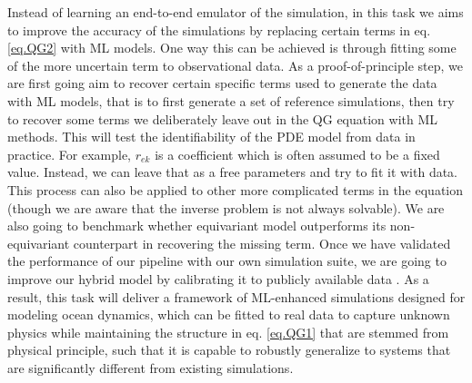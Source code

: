 \documentclass[11pt]{article}
\renewcommand{\paragraph}[1]{\medskip\par\noindent\textbf{#1~---}}
\newcommand{\kw}[1]{{\color{RoyalBlue}[KW: #1 ]}}
\begin{document}
Instead of learning an end-to-end emulator of the simulation, in this task we aims to improve the accuracy of the simulations by replacing certain terms in eq. \ref{eq.QG2} with ML models. One way this can be achieved is through fitting some of the more uncertain term to observational data.
As a proof-of-principle step, we are first going aim to recover certain specific terms used to generate the data with ML models, that is to first generate a set of reference simulations, then try to recover some terms we deliberately leave out in the QG equation with ML methods. This will test the identifiability of the PDE model from data in practice. For example, $r_{ek}$ is a coefficient which is often assumed to be a fixed value. Instead, we can leave that as a free parameters and try to fit it with data. This process can also be applied to other more complicated terms in the equation (though we are aware that the inverse problem is not always solvable). We are also going to benchmark whether equivariant model outperforms its non-equivariant counterpart in recovering the missing term. Once we have validated the performance of our pipeline with our own simulation suite, we are going to improve our hybrid model by calibrating it to publicly available data \cite{2004AGUFMSF31A0712O}. 
As a result, this task will deliver a framework of ML-enhanced simulations designed for modeling ocean dynamics, which can be fitted to real data to capture unknown physics while maintaining the structure in eq. \ref{eq.QG1} that are stemmed from physical principle, such that it is capable to robustly generalize to systems that are significantly different from existing simulations.




\end{document}

